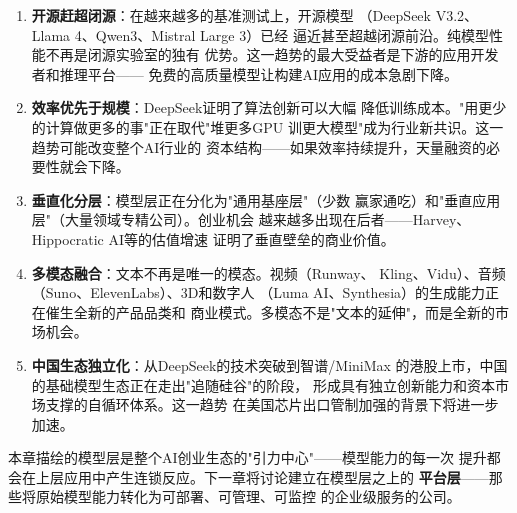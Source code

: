 \begin{keybox}
\begin{enumerate}
  \item \textbf{开源赶超闭源}：在越来越多的基准测试上，开源模型
    （DeepSeek V3.2、Llama 4、Qwen3、Mistral Large 3）已经
    逼近甚至超越闭源前沿。纯模型性能不再是闭源实验室的独有
    优势。这一趋势的最大受益者是下游的应用开发者和推理平台——
    免费的高质量模型让构建AI应用的成本急剧下降。

  \item \textbf{效率优先于规模}：DeepSeek证明了算法创新可以大幅
    降低训练成本。"用更少的计算做更多的事"正在取代"堆更多GPU
    训更大模型"成为行业新共识。这一趋势可能改变整个AI行业的
    资本结构——如果效率持续提升，天量融资的必要性就会下降。

  \item \textbf{垂直化分层}：模型层正在分化为"通用基座层"（少数
    赢家通吃）和"垂直应用层"（大量领域专精公司）。创业机会
    越来越多出现在后者——Harvey、Hippocratic AI等的估值增速
    证明了垂直壁垒的商业价值。

  \item \textbf{多模态融合}：文本不再是唯一的模态。视频（Runway、
    Kling、Vidu）、音频（Suno、ElevenLabs）、3D和数字人
    （Luma AI、Synthesia）的生成能力正在催生全新的产品品类和
    商业模式。多模态不是"文本的延伸"，而是全新的市场机会。

  \item \textbf{中国生态独立化}：从DeepSeek的技术突破到智谱/MiniMax
    的港股上市，中国的基础模型生态正在走出"追随硅谷"的阶段，
    形成具有独立创新能力和资本市场支撑的自循环体系。这一趋势
    在美国芯片出口管制加强的背景下将进一步加速。
\end{enumerate}

本章描绘的模型层是整个AI创业生态的"引力中心"——模型能力的每一次
提升都会在上层应用中产生连锁反应。下一章将讨论建立在模型层之上的
\textbf{平台层}——那些将原始模型能力转化为可部署、可管理、可监控
的企业级服务的公司。
\end{keybox}

